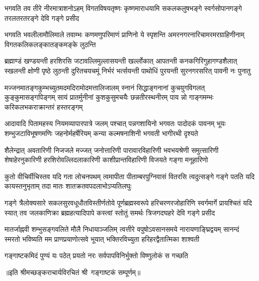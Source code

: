 

\fourlineindentedshloka
{भगवति तव तीरे नीरमात्राशनोऽहम्}
{विगतविषयतृष्णः कृष्णमाराधयामि}
{सकलकलुषभङ्गे स्वर्गसोपानगङ्गे}
{तरलतरतरङ्गे देवि गङ्गे प्रसीद}%

\fourlineindentedshloka
{भगवति भवलीलामौलिमाले तवाम्भः}
{कणमणुपरिमाणं प्राणिनो ये स्पृशन्ति}
{अमरनगरनारिचामरमरग्राहिणीनाम्}
{विगतकलिकलङ्कातङ्कमङ्के लुठन्ति}%

\fourlineindentedshloka
{ब्रह्माण्डं खण्डयन्ती हरशिरसि जटावल्लिमुल्लासयन्ती}
{खर्ल्लोकात् आपतन्ती कनकगिरिगुहागण्डशैलात् स्खलन्ती}
{क्षोणी पृष्ठे लुठन्ती दुरितचयचमूं निर्भरं भर्त्सयन्ती}
{पाथोधिं पुरयन्ती सुरनगरसरित् पावनी नः पुनातु}%

\fourlineindentedshloka
{मज्जनमातङ्गकुम्भच्युतमदमदिरामोदमत्तालिजालम्}
{स्नानं सिद्धाङ्गनानां कुचयुगविगलत् कुङ्कुमासङ्गपिङ्गम्}
{सायं प्रातर्मुनीनां कुशकुसुमचयैः छन्नतीरस्थनीरम्}
{पाय न्नो गाङ्गमम्भः करिकलभकराक्रान्तरं हस्तरङ्गम्}%

\fourlineindentedshloka
{आदावादि पितामहस्य नियमव्यापारपात्रे जलम्}
{पश्चात् पन्नगशायिनो भगवतः पादोदकं पावनम्}
{भूयः शम्भुजटाविभूषणमणिः जहनोर्महर्षेरियम्}
{कन्या कल्मषनाशिनी भगवती भागीरथी दृश्यते}%

\fourlineindentedshloka
{शैलेन्द्रात् अवतारिणी निजजले मज्जत् जनोत्तारिणी}
{पारावारविहारिणी भवभयश्रेणी समुत्सारिणी}
{शेषाहेरनुकारिणी हरशिरोवल्लिदलाकारिणी}
{काशीप्रान्तविहारिणी विजयते गङ्गा मनूहारिणो}%

\fourlineindentedshloka
{कुतो वीचिर्वीचिस्तव यदि गता लोचनपथम्}
{त्वमापीता पीताम्बरपुग्निवासं वितरसि}
{त्वदुत्सङ्गे गङ्गे पतति यदि कायस्तनुभृताम्}
{तदा मातः शातक्रतवपदलाभोऽप्यतिलघुः}%

\fourlineindentedshloka
{गङ्गे त्रैलोक्यसारे सकलसुरवधूधौतविस्तीर्णतोये}
{पूर्णब्रह्मस्वरूपे हरिचरणरजोहारिणि स्वर्गमार्गे}
{प्रायश्चितं यदि स्यात् तव जलकाणिक्रा ब्रह्महत्यादिपापे}
{कस्त्वां स्तोतुं समर्थः त्रिजगदघहरे देवि गङ्गे प्रसीद}%

\fourlineindentedshloka
{मातर्जाह्नवी शम्भुसङ्गवलिते मौलै निधायाञ्जलिम्}
{त्वत्तीरे वपुषोऽवसानसमये नारायणाङ्घ्रिद्वयम्}
{सानन्दं स्मरतो भविष्यति मम प्राणप्रयाणोत्सवे}
{भूयात् भक्तिरविच्युता हरिहरद्वैतात्मिका शाश्वती}%

\twolineshloka
{गङ्गाष्टकमिदं पुण्यं यः पठेत् प्रयतो नरः}
{सर्वपापविनिर्भुक्तो विष्णुलोकं स गच्छति}%


॥इति श्रीमच्छङ्कराचार्यविरचितं श्री~गङ्गाष्टकं सम्पूर्णम्॥